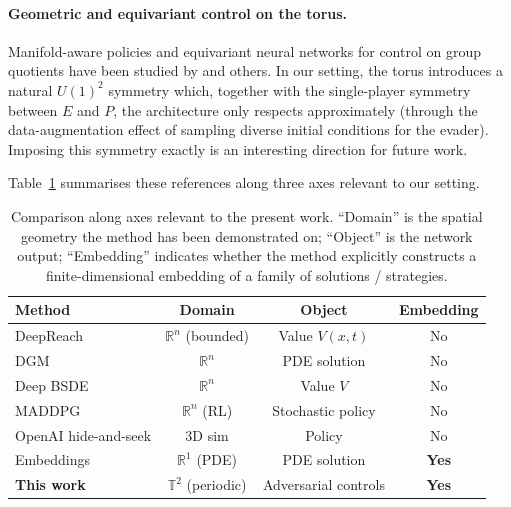 \documentclass[11pt]{article}
\newcommand{\TT}{\mathbb{T}^{2}}
\newcommand{\RR}{\mathbb{R}}
\begin{document}
\paragraph{Geometric and equivariant control on the torus.}
Manifold-aware policies and equivariant neural networks for control
on group quotients have been studied by
\citep{vandeven2021equivariant} and others.  In our setting, the torus
introduces a natural $U(1)^2$ symmetry which, together with the
single-player symmetry between $E$ and $P$, the architecture only
respects approximately (through the data-augmentation effect of
sampling diverse initial conditions for the evader).
Imposing this symmetry exactly is an interesting direction for
future work.

\medskip

\noindent
Table~\ref{tab:lit} summarises these references along three axes
relevant to our setting.

\begin{table}[h]
\centering
\caption{Comparison along axes relevant to the present work.
``Domain'' is the spatial geometry the method has been demonstrated
on; ``Object'' is the network output; ``Embedding'' indicates whether
the method explicitly constructs a finite-dimensional embedding of
a family of solutions / strategies.}
\label{tab:lit}
\small
\begin{tabular}{lccc}
\toprule
Method & Domain & Object & Embedding \\
\midrule
DeepReach \citep{bansaltomlin2021deepreach} & $\RR^n$ (bounded) & Value $V(x,t)$ & No \\
DGM \citep{sirignano2018dgm} & $\RR^n$ & PDE solution & No \\
Deep BSDE \citep{han2018deepbsde} & $\RR^n$ & Value $V$ & No \\
MADDPG \citep{lowe2017maddpg} & $\RR^n$ (RL) & Stochastic policy & No \\
OpenAI hide-and-seek \citep{baker2020emergent} & 3D sim & Policy & No \\
Embeddings \citep{JimenezEmbeddings2026} & $\RR^1$ (PDE) & PDE solution & \textbf{Yes} \\
\midrule
\textbf{This work} & $\TT$ (periodic) & Adversarial controls & \textbf{Yes} \\
\bottomrule
\end{tabular}
\end{table}

\end{document}
